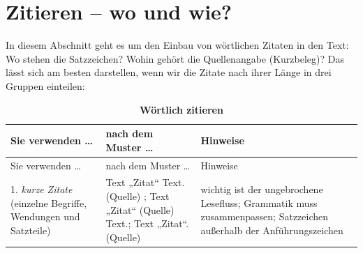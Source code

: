 \documentclass[]{book}
\theoremstyle{definition}
\theoremstyle{definition}
\theoremstyle{definition}
\theoremstyle{remark}
\begin{document}
\section{Zitieren -- wo und wie?}\label{zitieren-wo-und-wie}

In diesem Abschnitt geht es um den Einbau von wörtlichen Zitaten in den
Text: Wo stehen die Satzzeichen? Wohin gehört die Quellenangabe
(Kurzbeleg)? Das lässt sich am besten darstellen, wenn wir die Zitate
nach ihrer Länge in drei Gruppen einteilen:

\begin{longtable}[]{@{}lll@{}}
\caption{\textbf{\label{tab:zitieren2} Wörtlich zitieren}}\tabularnewline
\toprule
\begin{minipage}[b]{0.13\columnwidth}\raggedright\strut
Sie verwenden \ldots{}\strut
\end{minipage} & \begin{minipage}[b]{0.41\columnwidth}\raggedright\strut
nach dem Muster \ldots{}\strut
\end{minipage} & \begin{minipage}[b]{0.38\columnwidth}\raggedright\strut
Hinweise\strut
\end{minipage}\tabularnewline
\midrule
\endfirsthead
\toprule
\begin{minipage}[b]{0.13\columnwidth}\raggedright\strut
Sie verwenden \ldots{}\strut
\end{minipage} & \begin{minipage}[b]{0.41\columnwidth}\raggedright\strut
nach dem Muster \ldots{}\strut
\end{minipage} & \begin{minipage}[b]{0.38\columnwidth}\raggedright\strut
Hinweise\strut
\end{minipage}\tabularnewline
\midrule
\endhead
\begin{minipage}[t]{0.13\columnwidth}\raggedright\strut
1. \emph{kurze Zitate} (einzelne Begriffe, Wendungen und
Satzteile)\strut
\end{minipage} & \begin{minipage}[t]{0.41\columnwidth}\raggedright\strut
Text „Zitat`` Text. (Quelle) ; Text „Zitat`` (Quelle) Text.; Text
„Zitat``. (Quelle)\strut
\end{minipage} & \begin{minipage}[t]{0.38\columnwidth}\raggedright\strut
wichtig ist der ungebrochene Lesefluss; Grammatik muss zusammenpassen;
Satzzeichen außerhalb der Anführungszeichen \vspace{-6mm}\strut
\end{minipage}\tabularnewline

\end{longtable}
\end{document}
